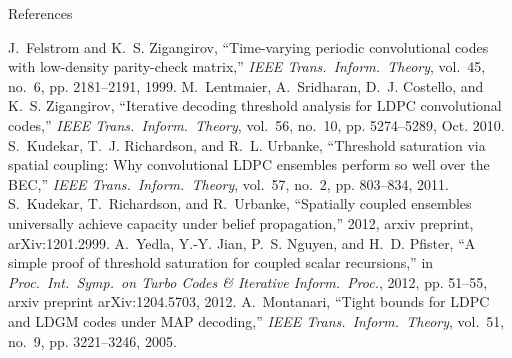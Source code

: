 \documentclass{beamer}
\newlength{\threecolwid}
\begin{document}
\begin{frame}
\begin{columns}[t]
\begin{column}{\threecolwid}
\begin{block}{References}
      \begin{thebibliography}{10}
        \vspace{1cm}
        J.~Felstrom and K.~S. Zigangirov, ``Time-varying periodic convolutional codes
        with low-density parity-check matrix,'' \emph{IEEE Trans.\ Inform.\ Theory},
        vol.~45, no.~6, pp. 2181--2191, 1999.
        \vspace{1cm}
        M.~Lentmaier, A.~Sridharan, D.~J. Costello, and K.~S. Zigangirov, ``Iterative
        decoding threshold analysis for {LDPC} convolutional codes,'' \emph{IEEE
          Trans.\ Inform.\ Theory}, vol.~56, no.~10, pp. 5274--5289, Oct. 2010.
        \vspace{1cm}
        S.~Kudekar, T.~J. Richardson, and R.~L. Urbanke, ``Threshold saturation via
        spatial coupling: {W}hy convolutional {LDPC} ensembles perform so well over
        the {BEC},'' \emph{IEEE Trans.\ Inform.\ Theory}, vol.~57, no.~2, pp.
        803--834, 2011.
        \vspace{1cm}
        S.~Kudekar, T.~Richardson, and R.~Urbanke, ``Spatially coupled ensembles
        universally achieve capacity under belief propagation,'' 2012, arxiv preprint,
        arXiv:1201.2999.
        \vspace{1cm}
        A.~Yedla, Y.-Y. Jian, P.~S. Nguyen, and H.~D. Pfister, ``A simple proof of
        threshold saturation for coupled scalar recursions,'' in \emph{Proc.\ Int.\
          Symp.\ on Turbo Codes \& Iterative Inform.\ Proc.}, 2012, pp. 51--55, arxiv
        preprint arXiv:1204.5703, 2012.
        \vspace{1cm}
        A.~Montanari, ``Tight bounds for {LDPC} and {LDGM} codes under {MAP}
        decoding,'' \emph{IEEE Trans.\ Inform.\ Theory}, vol.~51, no.~9, pp.
        3221--3246, 2005.
      \end{thebibliography}
    \end{block}
  \end{column}
\end{columns}
\end{frame}
\end{document}

